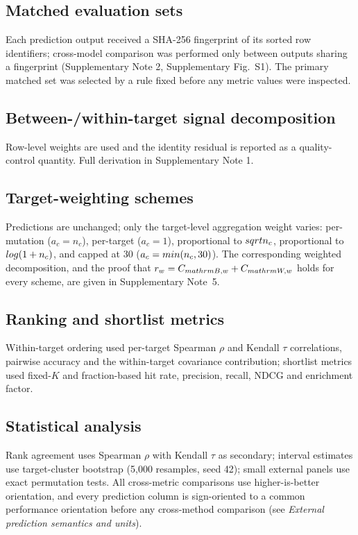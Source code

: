 \documentclass[11pt,a4paper]{article}
\begin{document}
\subsection*{Matched evaluation sets}
Each prediction output received a SHA-256 fingerprint of its sorted row identifiers;
cross-model comparison was performed only between outputs sharing a fingerprint
(Supplementary Note 2, Supplementary Fig.~S1). The primary matched set was selected by a
rule fixed before any metric values were inspected.

\subsection*{Between-/within-target signal decomposition}
Row-level weights are used and the identity residual is reported as a quality-control
quantity. Full derivation in Supplementary Note 1.


\subsection*{Target-weighting schemes}
Predictions are unchanged; only the target-level aggregation weight varies: per-mutation ($a_c = n_c$), per-target ($a_c = 1$), proportional to $\\sqrt{n_c}$, proportional to $\\log(1+n_c)$, and capped at 30 ($a_c = \\min(n_c, 30)$). The corresponding weighted decomposition, and the proof that $r_w = C_{\\mathrm{B},w} + C_{\\mathrm{W},w}$ holds for every scheme, are given in Supplementary Note~5.

\subsection*{Ranking and shortlist metrics}
Within-target ordering used per-target Spearman $\rho$ and Kendall $\tau$ correlations,
pairwise accuracy and the within-target covariance contribution; shortlist metrics used
fixed-$K$ and fraction-based hit rate, precision, recall, NDCG and enrichment
factor\cite{ndcg}.

\subsection*{Statistical analysis}
Rank agreement uses Spearman $\rho$ with Kendall $\tau$ as secondary; interval estimates use
target-cluster bootstrap (5{,}000 resamples, seed 42)\cite{bootstrap}; small external
panels use exact permutation tests. All cross-metric comparisons use higher-is-better orientation\cite{biometry}, and every
prediction column is sign-oriented to a common performance orientation before any
cross-method comparison (see \emph{External prediction semantics and units}).
\end{document}
